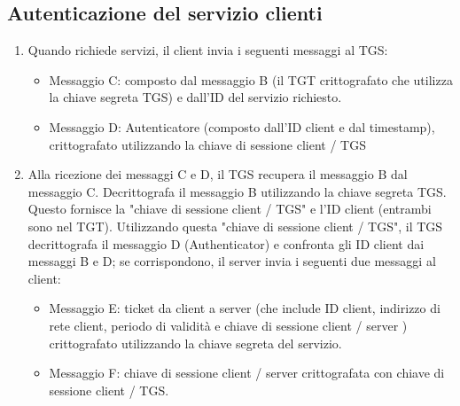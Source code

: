 \subsection{Autenticazione del servizio clienti}
\begin{enumerate}
    \item Quando richiede servizi, il client invia i seguenti messaggi al TGS:
    
    \begin{itemize}
        \item Messaggio C: composto dal messaggio B (il TGT crittografato che utilizza la chiave segreta TGS) e dall'ID del servizio richiesto.
        
        \item Messaggio D: Autenticatore (composto dall'ID client e dal timestamp), crittografato utilizzando la chiave di sessione client / TGS
    \end{itemize}
    
    \item Alla ricezione dei messaggi C e D, il TGS recupera il messaggio B dal messaggio C. Decrittografa il messaggio B utilizzando la chiave segreta TGS. Questo fornisce la "chiave di sessione client / TGS" e l'ID client (entrambi sono nel TGT). Utilizzando questa "chiave di sessione client / TGS", il TGS decrittografa il messaggio D (Authenticator) e confronta gli ID client dai messaggi B e D; se corrispondono, il server invia i seguenti due messaggi al client:
    
    \begin{itemize}
        \item Messaggio E: ticket da client a server (che include ID client, indirizzo di rete client, periodo di validità e chiave di sessione client / server ) crittografato utilizzando la chiave segreta del servizio.
        
        \item Messaggio F: chiave di sessione client / server crittografata con chiave di sessione client / TGS.
    \end{itemize}
\end{enumerate}
